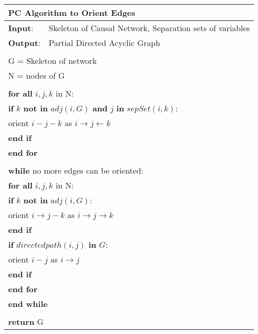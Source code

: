 \documentclass{article}
\begin{document}
\begin{table}[h!]
	\begin{tabular}{|l l|}
		\hline
		\multicolumn{2}{|l|}{PC Algorithm to Orient Edges}\\ 
		\hline
		\textbf{Input}: & Skeleton of Causal Network, Separation sets of variables\\
		\textbf{Output}: & Partial Directed Acyclic Graph\\
		&\\
		\multicolumn{2}{|l|}{G = Skeleton of network}\\
		\multicolumn{2}{|l|}{N = nodes of G}\\
		&\\
		\multicolumn{2}{|l|}{\textbf{for all} $ i,j,k $ in N:}\\
		\multicolumn{2}{|l|}{\quad\textbf{if} $ k $ \textbf{not in} $ adj(i,G) $ \textbf{and} $ j $ \textbf{in} $sepSet( i,k)$:}\\
		\multicolumn{2}{|l|}{\quad\quad orient $ i-j-k $ as $ i\rightarrow j \leftarrow k $ }\\
		\multicolumn{2}{|l|}{\quad\textbf{end if}}\\
		\multicolumn{2}{|l|}{\textbf{end for}}\\
		&\\
		\multicolumn{2}{|l|}{\textbf{while} no more edges can be oriented:}\\
		\multicolumn{2}{|l|}{\quad\textbf{for all} $ i,j,k $ in N:}\\
		\multicolumn{2}{|l|}{\quad\quad\textbf{if} $ k $ \textbf{not in} $ adj(i,G) $:}\\
		\multicolumn{2}{|l|}{\quad\quad\quad orient $ i\rightarrow j-k $ as $ i\rightarrow j \rightarrow k $ }\\
		\multicolumn{2}{|l|}{\quad\quad\textbf{end if}}\\
		\multicolumn{2}{|l|}{\quad\quad\textbf{if} $ directedpath(i,j)$ \textbf{in} $G $:}\\
		\multicolumn{2}{|l|}{\quad\quad\quad orient $ i- j $ as $ i\rightarrow j $ }\\
		\multicolumn{2}{|l|}{\quad\quad\textbf{end if}}\\
		
		\multicolumn{2}{|l|}{\quad\textbf{end for}}\\
		\multicolumn{2}{|l|}{\textbf{end while}}\\
		&\\
		\multicolumn{2}{|l|}{\textbf{return} G}\\
		\hline 
	\end{tabular}
\end{table}
\end{document}
